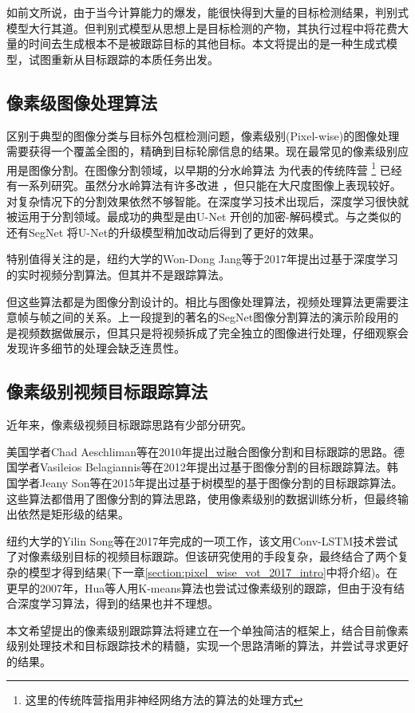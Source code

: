 \par
如前文所说，由于当今计算能力的爆发，能很快得到大量的目标检测结果，判别式模型大行其道。但判别式模型从思想上是目标检测的产物，其执行过程中将花费大量的时间去生成根本不是被跟踪目标的其他目标。本文将提出的是一种生成式模型，试图重新从目标跟踪的本质任务出发。

\subsection{像素级图像处理算法}
区别于典型的图像分类与目标外包框检测问题，像素级别(Pixel-wise)的图像处理需要获得一个覆盖全图的，精确到目标轮廓信息的结果。现在最常见的像素级别应用是图像分割。在图像分割领域，以早期的分水岭算法
\supercite{olsen1997multi}
为代表的传统阵营
\footnote{这里的传统阵营指用非神经网络方法的算法的处理方式}
已经有一系列研究。虽然分水岭算法有许多改进
\supercite{grau2004improved}
，但只能在大尺度图像上表现较好。对复杂情况下的分割效果依然不够智能。在深度学习技术出现后，深度学习很快就被运用于分割领域。最成功的典型是由U-Net
\supercite{ronneberger2015u}
开创的加密-解码模式。与之类似的还有SegNet
\supercite{badrinarayanan2017segnet}
将U-Net的升级模型稍加改动后得到了更好的效果。
\par
特别值得关注的是，纽约大学的Won-Dong Jang等于2017年提出过基于深度学习的实时视频分割算法\supercite{jang2017online}。但其并不是跟踪算法。
\par
但这些算法都是为图像分割设计的。相比与图像处理算法，视频处理算法更需要注意帧与帧之间的关系。上一段提到的著名的SegNet图像分割算法的演示阶段用的是视频数据做展示，但其只是将视频拆成了完全独立的图像进行处理，仔细观察会发现许多细节的处理会缺乏连贯性。

\subsection{像素级别视频目标跟踪算法}
近年来，像素级视频目标跟踪思路有少部分研究。
\par
美国学者Chad Aeschliman等在2010年提出过融合图像分割和目标跟踪的思路\supercite{aeschliman2010probabilistic}。德国学者Vasileios Belagiannis等在2012年提出过基于图像分割的目标跟踪算法\supercite{belagiannis2012segmentation}。韩国学者Jeany Son等在2015年提出过基于树模型的基于图像分割的目标跟踪算法\supercite{son2015tracking}。这些算法都借用了图像分割的算法思路，使用像素级别的数据训练分析，但最终输出依然是矩形级的结果。
\par
纽约大学的Yilin Song等在2017年完成的一项工作\supercite{DBLP:journals/corr/abs-1711-07377}，该文用Conv-LSTM技术\supercite{PatrauceanHC16}尝试了对像素级别目标的视频目标跟踪。但该研究使用的手段复杂，最终结合了两个复杂的模型才得到结果(下一章\ref{section:pixel_wise_vot_2017_intro}中将介绍)。在更早的2007年，Hua等人用K-means算法也尝试过像素级别的跟踪\supercite{hua2008k}，但由于没有结合深度学习算法，得到的结果也并不理想。
\par
本文希望提出的像素级别跟踪算法将建立在一个单独简洁的框架上，结合目前像素级别处理技术和目标跟踪技术的精髓，实现一个思路清晰的算法，并尝试寻求更好的结果。

